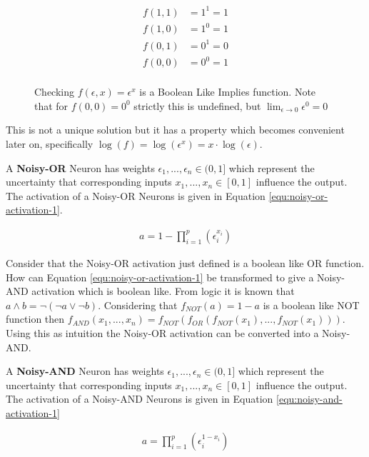 \begin{figure}[H]
\begin{align*}
f(1,1) &= 1^1 = 1\\
f(1,0) &= 1^0 = 1\\
f(0,1) &= 0^1 = 0\\
f(0,0) &= 0^0 = 1\\
\end{align*}
\caption{Checking $f(\epsilon, x) = \epsilon^x$ is a Boolean Like Implies function. Note that for $f(0,0) = 0^0$ strictly this is undefined, but $\lim_{\epsilon \rightarrow 0} \epsilon^0 = 0$}
\label{fig:f-check-implies}
\end{figure}

This is not a unique solution but it has a property which becomes convenient later on, specifically $\log(f) = \log(\epsilon^x) = x \cdot \log(\epsilon)$.

\begin{definition}
	A \textbf{Noisy-OR} Neuron has weights $\epsilon_1, ..., \epsilon_n \in (0,1]$ which represent the uncertainty that corresponding inputs $x_1, ..., x_n \in [0,1]$ influence the output. The activation of a Noisy-OR Neurons is given in Equation \ref{equ:noisy-or-activation-1}.
	
	\begin{align}
	a = 1 - \prod^p_{i=1} (\epsilon_i^{x_i})
	\label{equ:noisy-or-activation-1}
	\end{align}
\end{definition}

Consider that the Noisy-OR activation just defined is a boolean like OR function. How can Equation \ref{equ:noisy-or-activation-1} be transformed to give a Noisy-AND activation which is boolean like. From logic it is known that $a \land b = \lnot (\lnot a \lor \lnot b)$. Considering that $f_{NOT}(a) = 1 - a$ is a boolean like NOT function then $f_{AND}(x_1, ..., x_n) = f_{NOT}(f_{OR}(f_{NOT}(x_1), ..., f_{NOT}(x_1)))$. Using this as intuition the Noisy-OR activation can be converted into a Noisy-AND.

\begin{definition}
	A \textbf{Noisy-AND} Neuron has weights $\epsilon_1, ..., \epsilon_n \in (0, 1]$ which represent the uncertainty that corresponding inputs $x_1, ..., x_n \in [0,1]$ influence the output. The activation of a Noisy-AND Neurons is given in Equation \ref{equ:noisy-and-activation-1}
	
	\begin{align}
	a = \prod^p_{i=1} (\epsilon_i^{1 - x_i})
	\label{equ:noisy-and-activation-1}
	\end{align}
\end{definition}


